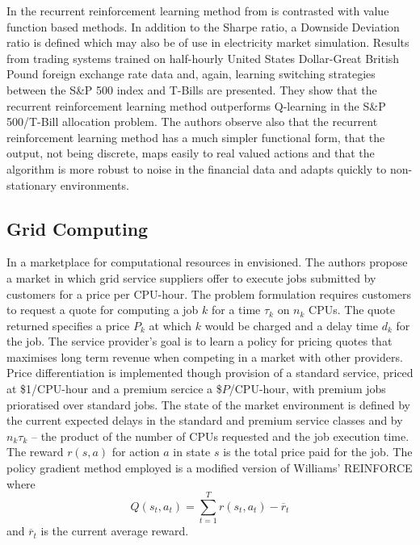 In \cite{moody:direct} the recurrent reinforcement learning method from
\cite{moody:98} is contrasted with value function based methods.  In addition
to the Sharpe ratio, a Downside Deviation ratio is defined which may also
be of use in electricity market simulation.  Results from trading
systems trained on half-hourly United States Dollar-Great British Pound foreign
exchange rate data and, again, learning switching strategies between the S\&P
500 index and T-Bills are presented.  They show that the recurrent
reinforcement learning method outperforms Q-learning in the S\&P
500/T-Bill allocation problem.  The authors observe also that the recurrent
reinforcement learning method has a much simpler functional form, that the
output, not being discrete, maps easily to real valued actions and that the
algorithm is more robust to noise in the financial data and adapts quickly to
non-stationary environments.

\subsection{Grid Computing}
In \cite{vengerov:grid} a marketplace for computational resources in
envisioned.  The authors propose a market in which grid service suppliers offer
to execute jobs submitted by customers for a price per CPU-hour.  The problem
formulation requires customers to request a quote for computing a job $k$ for a
time $\tau_k$ on $n_k$ CPUs.  The quote returned specifies a price $P_k$ at
which $k$ would be charged and a delay time $d_k$ for the job.  The service
provider's goal is to learn a policy for pricing quotes that maximises long
term revenue when competing in a market with other providers.  Price
differentiation is implemented though provision of a standard service, priced
at \$1/CPU-hour and a premium sercice a \$$P$/CPU-hour, with premium jobs
prioratised over standard jobs.  The state of the market environment is
defined by the current expected delays in the standard and premium service
classes and by $n_k \tau_k$ -- the product of the number of CPUs requested and
the job execution time.  The reward $r(s,a)$ for action $a$ in state $s$ is the
total price paid for the job.  The policy gradient method employed is a
modified version of Williams' REINFORCE where
\begin{equation}
Q(s_t,a_t) = \sum_{t=1}^T r(s_t,a_t) - \overline{r}_t
\end{equation}
and $\overline{r}_t$ is the current average reward.

